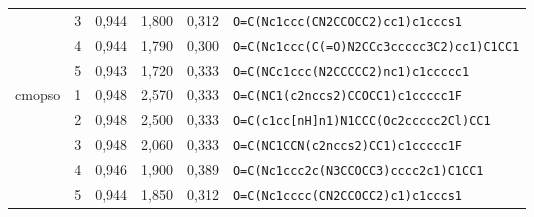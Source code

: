 \begin{table}[H]
\begin{tabular}{lccccl}
 & 3 & 0,944 & 1,800 & 0,312 & \texttt{O=C(Nc1ccc(CN2CCOCC2)cc1)c1cccs1} \\
 & 4 & 0,944 & 1,790 & 0,300 & \texttt{O=C(Nc1ccc(C(=O)N2CCc3ccccc3C2)cc1)C1CC1} \\
 & 5 & 0,943 & 1,720 & 0,333 & \texttt{O=C(NCc1ccc(N2CCCCC2)nc1)c1ccccc1} \\
\midrule
\multirow{5}{*}{\acrshort{cmopso}}
 & 1 & 0,948 & 2,570 & 0,333 & \texttt{O=C(NC1(c2nccs2)CCOCC1)c1ccccc1F} \\
 & 2 & 0,948 & 2,500 & 0,333 & \texttt{O=C(c1cc[nH]n1)N1CCC(Oc2ccccc2Cl)CC1} \\
 & 3 & 0,948 & 2,060 & 0,333 & \texttt{O=C(NC1CCN(c2nccs2)CC1)c1ccccc1F} \\
 & 4 & 0,946 & 1,900 & 0,389 & \texttt{O=C(Nc1ccc2c(N3CCOCC3)cccc2c1)C1CC1} \\
 & 5 & 0,944 & 1,850 & 0,312 & \texttt{O=C(Nc1cccc(CN2CCOCC2)c1)c1cccs1} \\
\bottomrule
\end{tabular}
\end{table}
